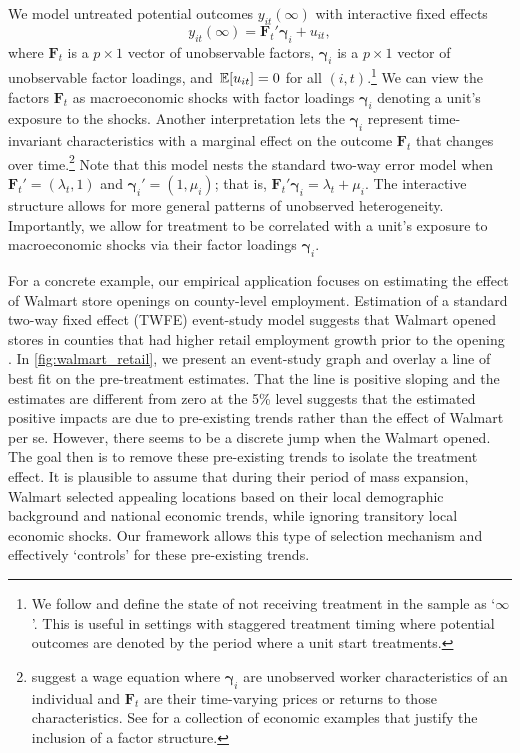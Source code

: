 \documentclass[12pt]{article}
\begin{document}
We model untreated potential outcomes $y_{it}(\infty)$ with interactive fixed effects
\begin{equation}\label{eq:untreated_po}
    y_{it}(\infty) = \bm{F}_t' \bm{\gamma}_i + u_{it},
\end{equation}
where $\bm{F}_t$ is a $p \times 1$ vector of unobservable factors, $\bm \gamma_i$ is a $p \times 1$ vector of unobservable factor loadings, and $\expec{u_{it}} = 0$ for all $(i,t)$.\footnote{We follow \citet{Callaway_Santanna_2021} and define the state of not receiving treatment in the sample as `$\infty$'. This is useful in settings with staggered treatment timing where potential outcomes are denoted by the period where a unit start treatments.} We can view the factors $\bm{F}_t$ as macroeconomic shocks with factor loadings $\bm \gamma_i$ denoting a unit's exposure to the shocks. Another interpretation lets the $\bm \gamma_i$ represent time-invariant characteristics with a marginal effect on the outcome $\bm{F}_t$ that changes over time.\footnote{\citet{Ahn_Lee_Schmidt_2013} suggest a wage equation where $\bm \gamma_i$ are unobserved worker characteristics of an individual and $\bm{F}_t$ are their time-varying prices or returns to those characteristics. See \citet{Bai_2009} for a collection of economic examples that justify the inclusion of a factor structure.} Note that this model nests the standard two-way error model when $\bm{F}_t' = (\lambda_t, 1)$ and $\bm \gamma_i' = (1, \mu_i)$; that is, $\bm{F}_t' \bm \gamma_i = \lambda_t + \mu_i$. The interactive structure allows for more general patterns of unobserved heterogeneity. Importantly, we allow for treatment to be correlated with a unit's exposure to macroeconomic shocks via their factor loadings $\bm{\gamma}_i$. 

For a concrete example, our empirical application focuses on estimating the effect of Walmart store openings on county-level employment. Estimation of a standard two-way fixed effect (TWFE) event-study model suggests that Walmart opened stores in counties that had higher retail employment growth prior to the opening \citep{neumark2008effects}. In \autoref{fig:walmart_retail}, we present an event-study graph and overlay a line of best fit on the pre-treatment estimates. That the line is positive sloping and the estimates are different from zero at the 5\% level suggests that the estimated positive impacts are due to pre-existing trends rather than the effect of Walmart per se. However, there seems to be a discrete jump when the Walmart opened. The goal then is to remove these pre-existing trends to isolate the treatment effect. It is plausible to assume that during their period of mass expansion, Walmart selected appealing locations based on their local demographic background and national economic trends, while ignoring transitory local economic shocks. Our framework allows this type of selection mechanism and effectively `controls' for these pre-existing trends.
\end{document}
